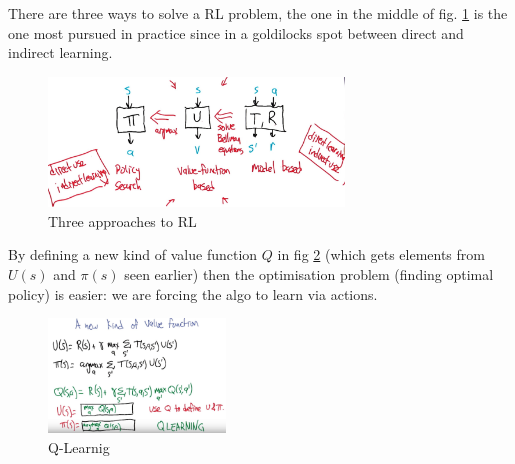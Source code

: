 \documentclass[11pt]{article}
\begin{document}
There are three ways to solve a RL problem, the one in the middle of fig. \ref{3_approaches_to_RL} is the one most pursued in practice since in a goldilocks spot between direct and indirect learning. 
\begin{figure}[htbp] 
	\centering
	\includegraphics[width=0.7\textwidth]{pics/3_approaches_to_RL}
	\caption{Three approaches to RL} 
	\label{3_approaches_to_RL}
\end{figure}

By defining a new kind of value function $Q$ in fig \ref{q_learning} (which gets elements from $U(s)$ and $\pi(s)$ seen earlier) then the optimisation problem (finding optimal policy) is easier: we are forcing the algo to learn via actions.
\begin{figure}[htbp] 
	\centering
	\includegraphics[width=0.42\textwidth]{pics/q_learning}
	\caption{Q-Learnig} 
	\label{q_learning}
\end{figure}
\end{document}
